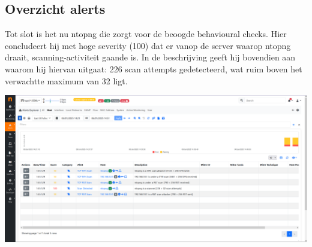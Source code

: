 \subsection{Overzicht alerts}
Tot slot is het nu ntopng die zorgt voor de beoogde behavioural checks. Hier concludeert hij met hoge severity (100) dat er vanop de server waarop ntopng draait, scanning-activiteit gaande is. In de beschrijving geeft hij bovendien aan waarom hij hiervan uitgaat: 226 scan attempts gedetecteerd, wat ruim boven het verwachtte maximum van 32 ligt.

\includegraphics[width=\textwidth]{graphics/nmap_scan.PNG}
